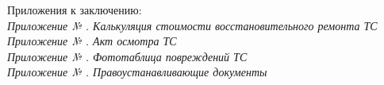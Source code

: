 Приложения к заключению:\\
\noindent \textit{\small 
    Приложение № \Rownum. Калькуляция стоимости восстановительного ремонта ТС\\
	Приложение № \Rownum. Акт осмотра ТС \\
	Приложение № \Rownum. Фототаблица повреждений ТС \\
	Приложение № \Rownum. Правоустанавливающие документы\\}


 \FPdiv{}



%
%
%